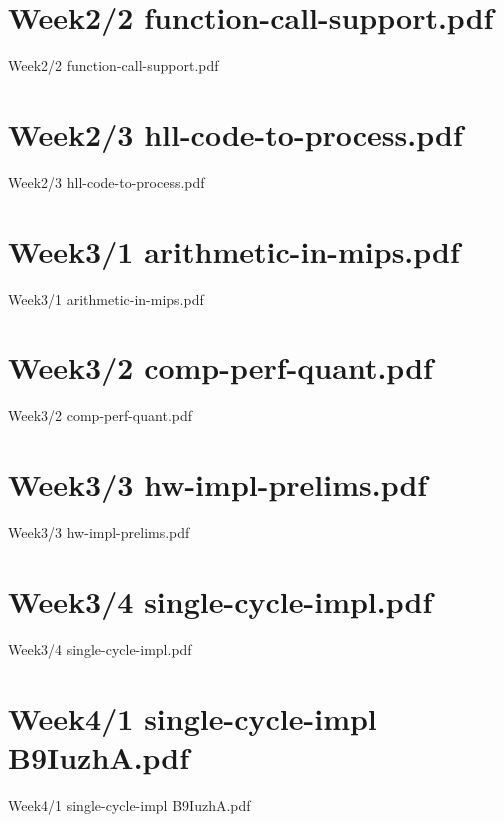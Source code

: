 \documentclass[aspectratio = 169]{beamer}
\begin{document}
\section{Week2/2 function-call-support.pdf}
\begin{frame}{Week2/2 function-call-support.pdf}
\end{frame}

\section{Week2/3 hll-code-to-process.pdf}
\begin{frame}{Week2/3 hll-code-to-process.pdf}
\end{frame}

\section{Week3/1 arithmetic-in-mips.pdf}
\begin{frame}{Week3/1 arithmetic-in-mips.pdf}
\end{frame}

\section{Week3/2 comp-perf-quant.pdf}
\begin{frame}{Week3/2 comp-perf-quant.pdf}
\end{frame}

\section{Week3/3 hw-impl-prelims.pdf}
\begin{frame}{Week3/3 hw-impl-prelims.pdf}
\end{frame}

\section{Week3/4 single-cycle-impl.pdf}
\begin{frame}{Week3/4 single-cycle-impl.pdf}
\end{frame}

\section{Week4/1 single-cycle-impl B9IuzhA.pdf}
\begin{frame}{Week4/1 single-cycle-impl B9IuzhA.pdf}
\end{frame}

\end{document}
